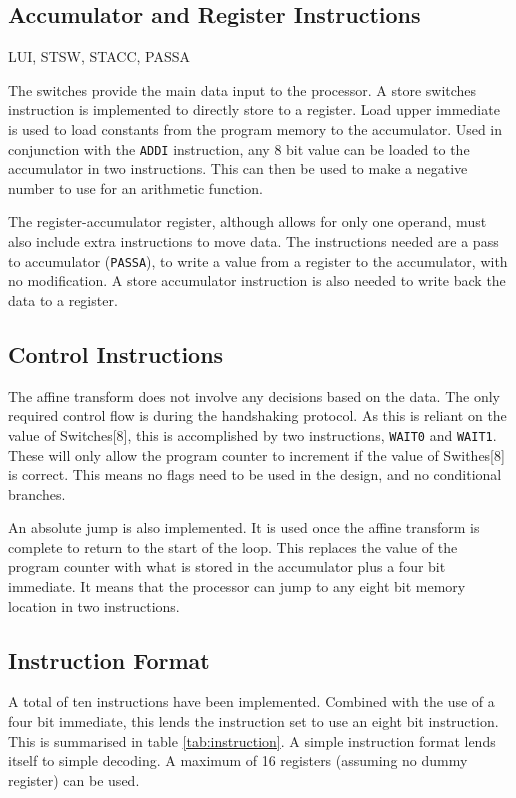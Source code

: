 \subsection{Accumulator and Register Instructions}
LUI, STSW, STACC, PASSA

The switches provide the main data input to the processor. 
A store switches instruction is implemented to directly store to a register. 
Load upper immediate is used to load constants from the program memory to the accumulator. 
Used in conjunction with the \texttt{ADDI} instruction, any 8 bit value can be loaded to the accumulator in two instructions. 
This can then be used to make a negative number to use for an arithmetic function.

The register-accumulator register, although allows for only one operand, must also include extra instructions to move data.
The instructions needed are a pass to accumulator (\texttt{PASSA}), to write a value from a register to the accumulator, with no modification. 
A store accumulator instruction is also needed to write back the data to a register. 

\subsection{Control Instructions}

The affine transform does not involve any decisions based on the data. 
The only required control flow is during the handshaking protocol. 
As this is reliant on the value of Switches[8], this is accomplished by two instructions, \texttt{WAIT0} and \texttt{WAIT1}. 
These will only allow the program counter to increment if the value of Swithes[8] is correct.
This means no flags need to be used in the design, and no conditional branches. 

An absolute jump is also implemented. 
It is used once the affine transform is complete to return to the start of the loop.
This replaces the value of the program counter with what is stored in the accumulator plus a four bit immediate. 
It means that the processor can jump to any eight bit memory location in two instructions.


\subsection{Instruction Format}

A total of ten instructions have been implemented. 
Combined with the use of a four bit immediate, this lends the instruction set to use an eight bit instruction.
This is summarised in table \ref{tab:instruction}.
A simple instruction format lends itself to simple decoding. 
A maximum of 16 registers (assuming no dummy register) can be used.

